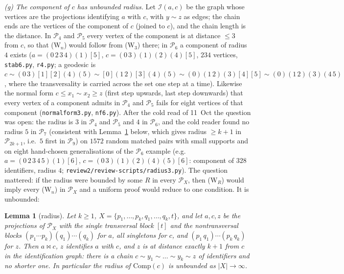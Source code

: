 \documentclass[11pt]{amsart}
\newtheorem{lemma}[theorem]{Lemma}
\theoremstyle{definition}
\renewcommand{\P}{\mathcal{P}}
\newcommand{\mt}{\bowtie}   %
\begin{document}
\emph{(g) The component of $c$ has unbounded radius.} Let $\mathcal I(a,c)$ be the graph whose vertices are the projections identifying $a$ with $c$, with $y\sim z$ as edges; the chain ends are the vertices of the component of $c$ (joined to $c$), and the chain length is the distance. In $\P_4$ and $\P_5$ every vertex of the component is at distance $\le3$ from $c$, so that (W$_n$) would follow from (W$_3$) there; in $\P_6$ a component of radius $4$ exists ($a=(0\,2\,3\,4)(1)[5]$, $c=(0\,3)(1)(2)(4)[5]$, $234$ vertices, \texttt{stab6.py}, \texttt{r4.py}; a geodesic is $c\sim(0\,3)[1][2](4)(5)\sim[0](1\,2)[3](4)(5)\sim(0)(1\,2)(3)[4][5]\sim(0)(1\,2)(3)(4\,5)$, where the transversality is carried across the set one step at a time). Likewise the normal form $c\le x_1\sim x_2\ge z$ (first step upwards, last step downwards) that every vertex of a component admits in $\P_4$ and $\P_5$ fails for eight vertices of that component (\texttt{normalform3.py}, \texttt{nf6.py}). After the cold read of 11~Oct the question was open: the radius is $3$ in $\P_4$ and $\P_5$ and $4$ in $\P_6$, and the cold reader found no radius $5$ in $\P_7$ (consistent with Lemma~\ref{lem:radius} below, which gives radius $\ge k+1$ in $\P_{2k+1}$, i.e.\ $5$ first in $\P_9$) on $1572$ random matched pairs with small supports and on eight hand-chosen generalisations of the $\P_6$ example (e.g.\ $a=(0\,2\,3\,4\,5)(1)[6]$, $c=(0\,3)(1)(2)(4)(5)[6]$: component of $328$ identifiers, radius $4$; \texttt{review2/review-scripts/radius3.py}). The question mattered: if the radius were bounded by some $R$ in every $\P_X$, then (W$_R$) would imply every (W$_n$) in $\P_X$ and a uniform proof would reduce to one condition. It is unbounded:

\begin{lemma}[radius]\label{lem:radius}
Let $k\ge1$, $X=\{p_1,\dots,p_k,q_1,\dots,q_k,t\}$, and let $a,c,z$ be the projections of $\P_X$ with the single transversal block $[t]$ and the nontransversal blocks $(p_1\cdots p_k)(q_1)\cdots(q_k)$ for $a$, all singletons for $c$, and $(p_1\,q_1)\cdots(p_k\,q_k)$ for $z$. Then $a\mt c$, $z$ identifies $a$ with $c$, and $z$ is at distance exactly $k+1$ from $c$ in the identification graph: there is a chain $c\sim y_1\sim\dots\sim y_k\sim z$ of identifiers and no shorter one. In particular the radius of $\mathrm{Comp}(c)$ is unbounded as $|X|\to\infty$.
\end{lemma}
\end{document}
